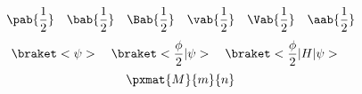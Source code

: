 \documentclass{jlreq}
\begin{document}
\[
    \pab{\frac{1}{2}}    \quad %
    \bab{\frac{1}{2}}    \quad %
    \Bab{\frac{1}{2}}    \quad %
    \vab{\frac{1}{2}}    \quad %
    \Vab{\frac{1}{2}}    \quad %
    \aab{\frac{1}{2}}          %
\]
\[
    \braket< \psi >                           \quad
    \braket< \frac{\phi}{2} | \psi >          \quad
    \braket< \frac{\phi}{2} | H | \psi >      \quad
\]
\[
    \pxmat{M}{m}{n}
\]
\end{document}
